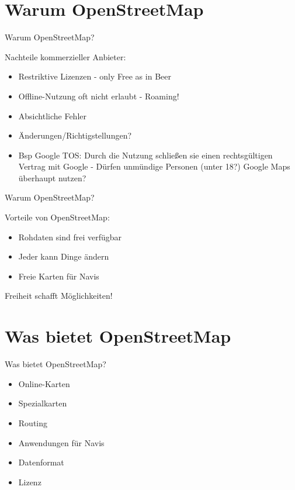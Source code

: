 \documentclass{beamer}
\begin{document}
\section{Warum OpenStreetMap}

\begin{frame}{Warum OpenStreetMap?}

Nachteile kommerzieller Anbieter:

\begin{itemize}
  \item Restriktive Lizenzen - only Free as in Beer
  \item Offline-Nutzung oft nicht erlaubt - Roaming!
  \item Absichtliche Fehler
  \item Änderungen/Richtigstellungen?
  \pause
  \item Bsp Google TOS: Durch die Nutzung schließen sie einen rechtsgültigen Vertrag mit Google - Dürfen unmündige Personen (unter 18?) Google Maps überhaupt nutzen?
\end{itemize}

\end{frame}

\begin{frame}{Warum OpenStreetMap?}

Vorteile von OpenStreetMap:

\begin{itemize}
  \item Rohdaten sind frei verfügbar
  \item Jeder kann Dinge ändern
  \item Freie Karten für Navis
\end{itemize}

Freiheit schafft Möglichkeiten!

\end{frame}


\section{Was bietet OpenStreetMap}

\begin{frame}{Was bietet OpenStreetMap?}

  \begin{itemize}
    \item Online-Karten
    \item Spezialkarten
    \item Routing
    \item Anwendungen für Navis
  \end{itemize}

  \begin{itemize}
    \item Datenformat
    \item Lizenz
  \end{itemize}

\end{frame}
\end{document}
